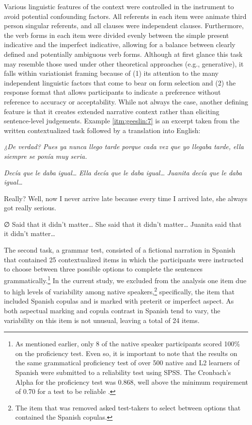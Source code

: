 \documentclass[output=paper]{langscibook}
\begin{document}
Various linguistic features of the context were controlled in the instrument to avoid potential confounding factors. All referents in each item were animate third person singular referents, and all clauses were independent clauses.  Furthermore, the verb forms in each item were divided evenly between the simple present indicative and the imperfect indicative, allowing for a balance between clearly defined and potentially ambiguous verb forms. Although at first glance this task may resemble those used under other theoretical approaches (e.g., generative), it falls within variationist framing because of (1) its attention to the many independent linguistic factors that come to bear on form selection and (2) the response format that allows participants to indicate a preference without reference to accuracy or acceptability. While not always the case, another defining feature is that it creates extended narrative context rather than eliciting sentence-level judgements. Example \ref{itm:geeslin:7} is an excerpt taken from the written contextualized task followed by a translation into English:\largerpage

\ea
\begin{xlist}
 \textit{¿De verdad? Pues ya nunca llego tarde porque cada vez que yo llegaba tarde, ella siempre se ponía muy seria.} \label{itm:geeslin:7}
 \begin{xlista}
 \ex \textit{Decía que le daba igual…}
 \ex \textit{Ella decía que le daba igual…}
 \ex \textit{Juanita decía que le daba igual…}
 \end{xlista}
 Really? Well, now I never arrive late because every time I arrived late, she always got really serious.  
 \begin{xlista}
 \ex ∅ Said that it didn’t matter…
 \ex She said that it didn’t matter…
 \ex Juanita said that it didn’t matter…
 \end{xlista}
 \end{xlist}
\z

The second task, a grammar test, consisted of a fictional narration in Spanish that contained 25 contextualized items in which the participants were instructed to choose between three possible options to complete the sentences grammatically.\footnote{As mentioned earlier, only 8 of the native speaker participants scored 100\% on the proficiency test. Even so, it is important to note that the results on the same grammatical proficiency test of over 500 native and L2 learners of Spanish were submitted to a reliability test using SPSS. The Cronbach’s Alpha for the proficiency test was 0.868, well above the minimum requirement of 0.70 for a test to be reliable \citep{GeorgeMallery2012}.} In the current study, we excluded from the analysis one item due to high levels of variability among native speakers,\footnote{The item that was removed asked test-takers to select between options that contained the Spanish copulas.} specifically, the item that included Spanish copulas and is marked with preterit or imperfect aspect. As both aspectual marking and copula contrast in Spanish tend to vary, the variability on this item is not unusual, leaving a total of 24 items.
\end{document}
